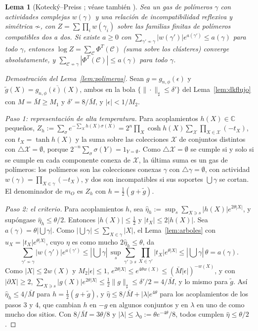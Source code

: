 \documentclass[11pt,a4paper]{article}
\newtheorem{lema}[teorema]{Lema}
\theoremstyle{remark}
\begin{document}
\begin{lema}[Kotecký--Preiss \cite{kp}; véase también {\cite[cap.~5]{fv}}]\label{lem:kp}
Sea un gas de polímeros $\gamma$ con actividades complejas $w(\gamma)$ y una relación de
incompatibilidad reflexiva y simétrica $\not\sim$, con
$Z=\sum\prod_iw(\gamma_i)$ sobre las familias finitas de polímeros compatibles dos a dos. Si existe
$a\ge0$ con $\sum_{\gamma'\not\sim\gamma}|w(\gamma')|e^{a(\gamma')}\le a(\gamma)$ para todo $\gamma$,
entonces $\log Z=\sum_{\mathcal C}\Phi^T(\mathcal C)$ (suma sobre los clústeres) converge
absolutamente, y $\sum_{\mathcal C\not\sim\gamma}|\Phi^T(\mathcal C)|\le a(\gamma)$ para todo $\gamma$.
\end{lema}

\begin{proof}[Demostración del Lema~\ref{lem:polimeros}]
Sean $g=g_{n,\phi}(\epsilon)$ y $\tilde g(X)=\overline{g_{n,\phi}(\bar\epsilon)(X)}$, ambos en la bola
$\{\|\cdot\|_\sharp\le\delta'\}$ del Lema~\ref{lem:dkflujo} con $M=\bar M\ge M_1$ y $\delta'=8/\bar M$, y
$|\epsilon|<1/M_2$.

\emph{Paso 1: representación de alta temperatura.} Para acoplamientos $h(X)\in\mathbb C$ pequeños,
$Z_h:=\sum_\sigma e^{-\sum_Xh(X)\sigma(X)}=2^n\prod_X\cosh h(X)\sum_{\mathcal X}\prod_{X\in\mathcal X}(-t_X)$,
con $t_X=\tanh h(X)$ y la suma sobre las colecciones $\mathcal X$ de conjuntos distintos con
$\triangle\mathcal X=\emptyset$, porque $2^{-n}\sum_\sigma\sigma(Y)=1_{Y=\emptyset}$. Como $\triangle\mathcal X=\emptyset$
se cumple si y solo si se cumple en cada componente conexa de $\mathcal X$, la última suma es un gas de
polímeros: los polímeros son las colecciones conexas $\gamma$ con $\triangle\gamma=\emptyset$, con
actividad $w(\gamma)=\prod_{X\in\gamma}(-t_X)$, y dos son incompatibles si sus soportes
$\bigcup\gamma$ se cortan. El denominador de $m_O$ es $Z_h$ con $h=\tfrac12(g+\tilde g)$.

\emph{Paso 2: el criterio.} Para acoplamientos $h$, sea
$\hat\eta_h:=\sup_s\sum_{X\ni s}|h(X)|e^{2\theta|X|}$, y supóngase $\hat\eta_h\le\theta/2$. Entonces
$|h(X)|\le\tfrac12$ y $|t_X|\le2|h(X)|$. Sea $a(\gamma)=\theta|\bigcup\gamma|$. Como
$|\bigcup\gamma|\le\sum_{X\in\gamma}|X|$, el Lema~\ref{lem:arboles} con $u_X=|t_X|e^{\theta|X|}$, cuyo $\eta$
es como mucho $2\hat\eta_h\le\theta$, da
\[
  \sum_{\gamma'\not\sim\gamma}|w(\gamma')|e^{a(\gamma')}\le|{\textstyle\bigcup}\gamma|\,\sup_s\sum_{\gamma'\ni s}\prod_{X\in\gamma'}|t_X|e^{\theta|X|}
  \le|{\textstyle\bigcup}\gamma|\,\theta=a(\gamma).
\]
Como $|X|\le2w(X)$ y $M_2|\epsilon|\le1$, $e^{2\theta|X|}\le e^{4\theta w(X)}\le(\bar M|\epsilon|)^{-w(X)}$, y con
$|\partial X|\ge2$, $\sum_{X\ni s}|g(X)|e^{2\theta|X|}\le\tfrac12\|g\|_\sharp\le\delta'/2=4/\bar M$, y lo mismo
para $\tilde g$. Así $\hat\eta_h\le4/\bar M$ para $h=\tfrac12(g+\tilde g)$, y $\hat\eta\le8/\bar M+|\lambda|e^{4\theta}$
para los acoplamientos de los pasos 3 y 4, que cambian $h$ en $-g$ en algunos conjuntos y en $\lambda$ en
uno de como mucho dos sitios. Con $8/\bar M=3\theta/8$ y $|\lambda|\le\lambda_0:=\theta e^{-4\theta}/8$, todos
cumplen $\hat\eta\le\theta/2$.


\end{proof}
\end{document}
